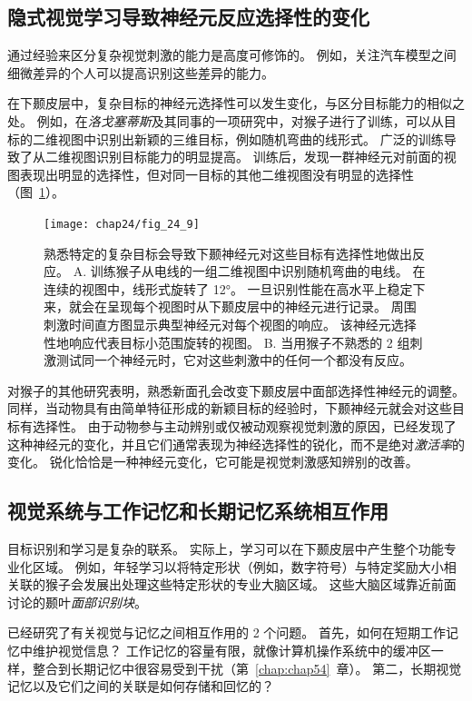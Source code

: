 \subsection{隐式视觉学习导致神经元反应选择性的变化}

通过经验来区分复杂视觉刺激的能力是高度可修饰的。
例如，关注汽车模型之间细微差异的个人可以提高识别这些差异的能力。


在下颞皮层中，复杂目标的神经元选择性可以发生变化，与区分目标能力的相似之处。
例如，在\textit{洛戈塞蒂斯}及其同事的一项研究中，对猴子进行了训练，可以从目标的二维视图中识别出新颖的三维目标，例如随机弯曲的线形式。
广泛的训练导致了从二维视图识别目标能力的明显提高。
训练后，发现一群神经元对前面的视图表现出明显的选择性，但对同一目标的其他二维视图没有明显的选择性（图~\ref{fig:24_9}）。


\begin{figure}[htbp]
	\centering
	\texttt{[image: chap24/fig\_24\_9]}
	\caption{熟悉特定的复杂目标会导致下颞神经元对这些目标有选择性地做出反应。
		A. 训练猴子从电线的一组二维视图中识别随机弯曲的电线。 在连续的视图中，线形式旋转了 12°。
		一旦识别性能在高水平上稳定下来，就会在呈现每个视图时从下颞皮层中的神经元进行记录。
		周围刺激时间直方图显示典型神经元对每个视图的响应。
		该神经元选择性地响应代表目标小范围旋转的视图。
		B. 当用猴子不熟悉的 2 组刺激测试同一个神经元时，它对这些刺激中的任何一个都没有反应。}
	\label{fig:24_9}
\end{figure}


对猴子的其他研究表明，熟悉新面孔会改变下颞皮层中面部选择性神经元的调整。
同样，当动物具有由简单特征形成的新颖目标的经验时，下颞神经元就会对这些目标有选择性。
由于动物参与主动辨别或仅被动观察视觉刺激的原因，已经发现了这种神经元的变化，并且它们通常表现为神经选择性的锐化，而不是绝对\textit{激活率}的变化。
锐化恰恰是一种神经元变化，它可能是视觉刺激感知辨别的改善。



\subsection{视觉系统与工作记忆和长期记忆系统相互作用}

目标识别和学习是复杂的联系。
实际上，学习可以在下颞皮层中产生整个功能专业化区域。
例如，年轻学习以将特定形状（例如，数字符号）与特定奖励大小相关联的猴子会发展出处理这些特定形状的专业大脑区域。
这些大脑区域靠近前面讨论的颞叶\textit{面部识别块}。


已经研究了有关视觉与记忆之间相互作用的 2 个问题。
首先，如何在短期工作记忆中维护视觉信息？
工作记忆的容量有限，就像计算机操作系统中的缓冲区一样，整合到长期记忆中很容易受到干扰（第~\ref{chap:chap54}~章）。
第二，长期视觉记忆以及它们之间的关联是如何存储和回忆的？


